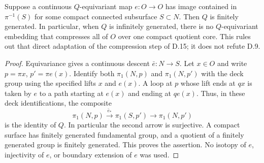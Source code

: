 Suppose a continuous $Q$-equivariant map $e:O\to O$ has
image contained in $\pi^{-1}(S)$ for some compact connected
subsurface $S\subset N$.  Then $Q$ is finitely generated.
In particular, when $Q$ is infinitely generated, there is no
$Q$-equivariant embedding that compresses all of $O$ over one
compact quotient core.  This rules out that direct adaptation
of the compression step of D.15; it does not refute D.9.
\begin{proof}
Equivariance gives a continuous descent $\bar e:N\to S$.
Let $x\in O$ and write $p=\pi x$, $p'=\pi e(x)$.
Identify both $\pi_1(N,p)$ and $\pi_1(N,p')$ with the
deck group using the specified lifts $x$ and $e(x)$.
A loop at $p$ whose lift ends at $qx$ is taken by $e$
to a path starting at $e(x)$ and ending at $qe(x)$.
Thus, in these deck identifications, the composite
\[
 \pi_1(N,p)\xrightarrow{\bar e_*}\pi_1(S,p')
 \longrightarrow\pi_1(N,p')
\]
is the identity of $Q$.  In particular the second arrow is
surjective.  A compact surface has finitely generated
fundamental group, and a quotient of a finitely generated
group is finitely generated.  This proves the assertion.
No isotopy of $e$, injectivity of $e$, or boundary extension
of $e$ was used.
\end{proof}

